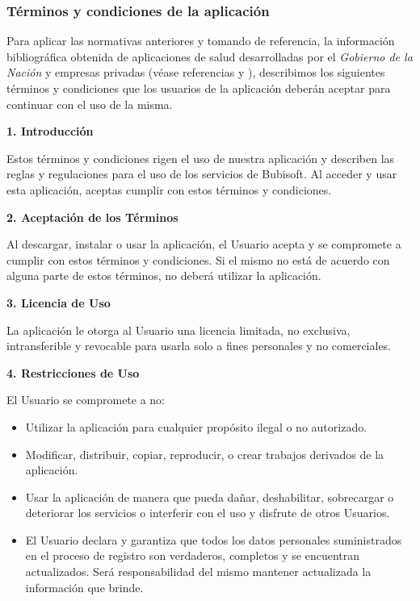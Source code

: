 \documentclass[a4paper,12pt]{article}
\begin{document}
    \subsubsection{Términos y condiciones de la aplicación}
    \par Para aplicar las normativas anteriores y tomando de referencia, la información bibliográfica obtenida de aplicaciones de salud desarrolladas por el \textit{Gobierno de la Nación} \cite{TerminosCondiciones1} y empresas privadas (véase referencias \cite{TerminosCondiciones2} y \cite{TerminosCondiciones3}), describimos los siguientes términos y condiciones que los usuarios de la aplicación deberán aceptar para continuar con el uso de la misma. 
    \newline
    \par \textbf{1. Introducción} 
    \newline
    \par Estos términos y condiciones rigen el uso de nuestra aplicación y describen las reglas y regulaciones para el uso de los servicios de Bubisoft. Al acceder y usar esta aplicación, aceptas cumplir con estos términos y condiciones.
    \newline
    \par \textbf{2. Aceptación de los Términos} 
    \newline
    \par Al descargar, instalar o usar la aplicación, el Usuario acepta y se compromete a cumplir con estos términos y condiciones. Si el mismo no está de acuerdo con alguna parte de estos términos, no deberá utilizar la aplicación. 
    \newline
    \par \textbf{3. Licencia de Uso} 
    \newline
    \par La aplicación le otorga al Usuario una licencia limitada, no exclusiva, intransferible y revocable para usarla solo a fines personales y no comerciales. 
    \newline
    \par \textbf{4. Restricciones de Uso} 
    \newline
    \par El Usuario se compromete a no:
    \begin{itemize}
        \item Utilizar la aplicación para cualquier propósito ilegal o no autorizado.
        \item Modificar, distribuir, copiar, reproducir, o crear trabajos derivados de la aplicación. 
        \item Usar la aplicación de manera que pueda dañar, deshabilitar, sobrecargar o deteriorar los servicios o interferir con el uso y disfrute de otros Usuarios. 
        \item El Usuario declara y garantiza que todos los datos personales suministrados en el proceso de registro son verdaderos, completos y se encuentran actualizados. Será responsabilidad del mismo mantener actualizada la información que brinde.
    \end{itemize}
\end{document}
